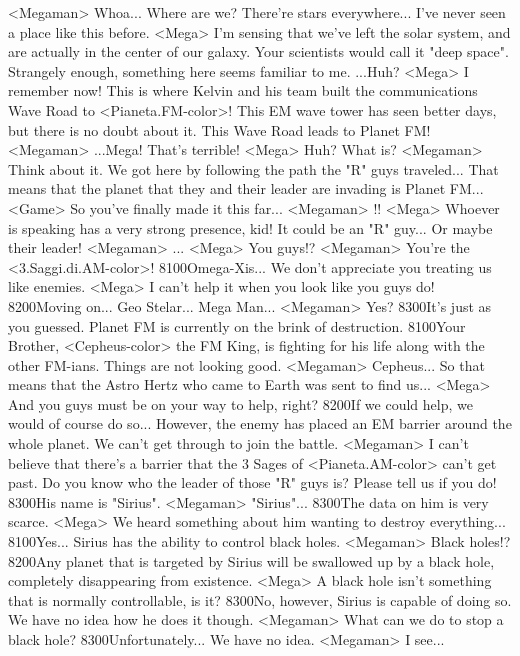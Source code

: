 <Megaman> Whoa... Where are we? 
There're stars everywhere... I've never seen a place like this before. 
<Mega> I'm sensing that we've left the solar system, and 
are actually in the center of our galaxy. 
Your scientists would call it "deep space". 
Strangely enough, something here seems familiar to me. 
...Huh? 
<Mega> I remember now! 
This is where Kelvin and his team built the communications Wave Road to <Pianeta.FM-color>! 
This EM wave tower has seen better days, but there is no doubt about it. 
This Wave Road leads to Planet FM! 
<Megaman> ...Mega! That's terrible! 
<Mega> Huh? What is? 
<Megaman> Think about it. 
We got here by following the path the "R" guys traveled... 
That means that the planet that they and their leader are invading is Planet FM... 
<Game> So you've finally made it this far... 
<Megaman> !! 
<Mega> Whoever is speaking has a very strong presence, kid! 
It could be an "R" guy... 
Or maybe their leader! 
<Megaman> ... 
<Mega> You guys!? 
<Megaman> You're the <3.Saggi.di.AM-color>! 
{81}{00}Omega-Xis... We don't appreciate you treating us like enemies. 
<Mega> I can't help it when you look like you guys do! 
{82}{00}Moving on... Geo Stelar... Mega Man... 
<Megaman> Yes? 
{83}{00}It's just as you guessed. 
Planet FM is currently on the brink of destruction. 
{81}{00}Your Brother, <Cepheus-color> the FM King, is fighting for 
his life along with the other FM-ians. 
Things are not looking good. 
<Megaman> Cepheus... 
So that means that the Astro Hertz who came to Earth was sent to find us... 
<Mega> And you guys must be on your way to help, right? 
{82}{00}If we could help, we would of course do so... 
However, the enemy has placed an EM barrier around the whole planet. 
We can't get through to join the battle. 
<Megaman> I can't believe that there's a barrier that the 3 Sages of <Pianeta.AM-color> can't get past. 
Do you know who the leader of those "R" guys is? 
Please tell us if you do! 
{83}{00}His name is "Sirius". 
<Megaman> "Sirius"... 
{83}{00}The data on him is very scarce. 
<Mega> We heard something about him wanting to destroy everything... 
{81}{00}Yes... 
Sirius has the ability to control black holes. 
<Megaman> Black holes!? 
{82}{00}Any planet that is targeted by Sirius will be swallowed up 
by a black hole, completely disappearing from existence. 
<Mega> A black hole isn't something that is normally controllable, is it? 
{83}{00}No, however, Sirius is capable of doing so. We have no idea how he does it though. 
<Megaman> What can we do to stop a black hole? 
{83}{00}Unfortunately... We have no idea. 
<Megaman> I see... 
